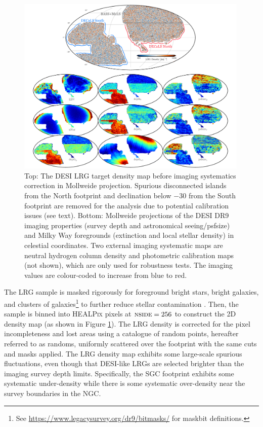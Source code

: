 \begin{figure}
 \centering
 \includegraphics[width=0.99\textwidth]{figures/dr9data.pdf}
 \caption{Top: The DESI LRG target density map before imaging systematics correction in Mollweide projection. Spurious disconnected islands from the North footprint and declination below $-30$ from the South footprint are removed for the analysis due to potential calibration issues (see text). Bottom: Mollweide projections of the DESI DR9 imaging properties (survey depth and astronomical seeing/psfsize) and Milky Way foregrounds (extinction and local stellar density) in celestial coordinates. Two external imaging systematic maps are neutral hydrogen column density and photometric calibration maps (not shown), which are only used for robustness tests. The imaging values are colour-coded to increase from blue to red.}
 \label{fig:ng}
\end{figure}

The LRG sample is masked rigorously for foreground bright stars, bright galaxies, and clusters of galaxies\footnote{See \url{https://www.legacysurvey.org/dr9/bitmasks/} for maskbit definitions.} to further reduce stellar contamination \citep{zhou2022target}. Then, the sample is binned into \textsc{HEALPix} \citep{gorski2005healpix} pixels at $\textsc{nside}=256$ to construct the 2D density map (as shown in Figure \ref{fig:ng}). The LRG density is corrected for the pixel incompleteness and lost areas using a catalogue of random points, hereafter referred to as randoms, uniformly scattered over the footprint with the same cuts and masks applied. The LRG density map exhibits some large-scale spurious fluctuations, even though that DESI-like LRGs are selected brighter than the imaging survey depth limits. Specifically, the SGC footprint exhibits some systematic under-density while there is some systematic over-density near the survey boundaries in the NGC.

